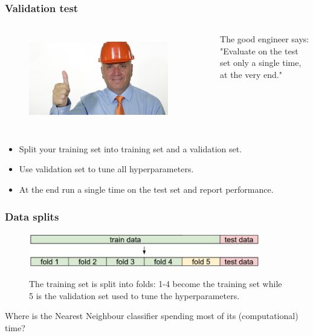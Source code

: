 \begin{frame}
        \frametitle{Validation test}

        \begin{columns}
                \begin{figure}
                        \includegraphics[width=0.9\textwidth]{Pics/good_engineer.jpg} \\
                \end{figure}
                The good engineer says: "Evaluate on the test set only a single time, at the very end."
        \end{columns}

	\begin{itemize}
		\item Split your training set into training set and a validation set. 
		\item Use validation set to tune all hyperparameters. 
		\item At the end run a single time on the test set and report performance.        
	\end{itemize}

\end{frame}

\begin{frame}
	\frametitle{Data splits}

	\begin{figure}
		\includegraphics[width=0.9\textwidth]{Pics/crossval.jpeg} \\
		\caption{The training set is split into folds: 1-4 become the training set while 5 is the validation set used to tune the hyperparameters.}
     	\end{figure}

	Where is the Nearest Neighbour classifier spending most of its (computational) time?

\end{frame}


